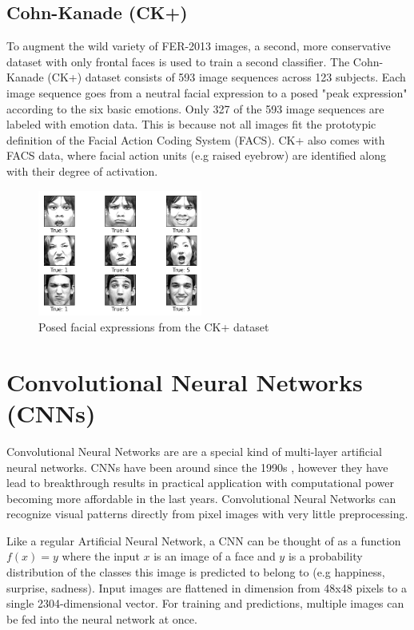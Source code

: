 \documentclass[twoside]{article}
\begin{document}
\begin{multicols}{2}
\subsection{Cohn-Kanade (CK+)}
To augment the wild variety of FER-2013 images, a second, more conservative dataset with only frontal faces is used to train a second classifier. The Cohn-Kanade (CK+) dataset consists of 593 image sequences across 123 subjects. Each image sequence goes from a neutral facial expression to a posed "peak expression" according to the six basic emotions. Only 327 of the 593 image sequences are labeled with emotion data. This is because not all images fit the prototypic definition of the Facial Action Coding System (FACS). CK+ also comes with FACS data, where facial action units (e.g raised eyebrow) are identified along with their degree of activation.

\begin{figure}[H]
	\includegraphics[width=0.48\textwidth]{ckplus_examples}
	\caption{Posed facial expressions from the CK+ dataset}
\end{figure}


\section{Convolutional Neural Networks (CNNs)}
Convolutional Neural Networks are are a special kind of multi-layer artificial neural networks. CNNs have been around since the 1990s \cite{lecun98}, however they have lead to breakthrough results in practical application with computational power becoming more affordable in the last years. Convolutional Neural Networks can recognize visual patterns directly from pixel images with very little preprocessing. 

Like a regular Artificial Neural Network, a CNN can be thought of as a function $f(x) = y$ where the input $x$ is an image of a face and $y$ is a probability distribution of the classes this image is predicted to belong to (e.g happiness, surprise, sadness). Input images are flattened in dimension from 48x48 pixels to a single 2304-dimensional vector. For training and predictions, multiple images can be fed into the neural network at once.


\end{multicols}
\end{document}

